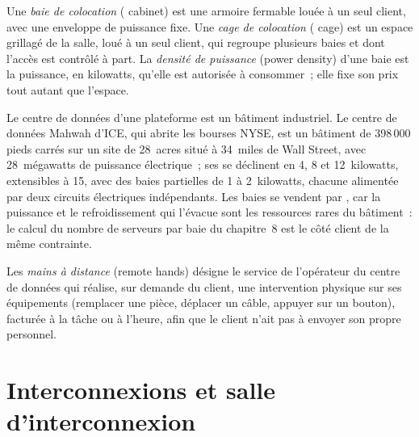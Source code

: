 \begin{definition}\label{def:nw:colocation-products-and-how-they-are-sold:cabinet}
Une \emph{baie de colocation} ( cabinet) est une armoire fermable louée à un seul client, avec une enveloppe de puissance fixe. Une
\emph{cage de colocation} ( cage) est un espace grillagé de la salle, loué à un seul client, qui regroupe plusieurs baies et dont l'accès
est contrôlé à part. La \emph{densité de puissance} (power density) d'une baie est la puissance, en kilowatts, qu'elle est autorisée à consommer~; elle
fixe son prix tout autant que l'espace.
\end{definition}

Le centre de données d'une plateforme est un bâtiment industriel. Le centre de données Mahwah d'ICE, qui abrite les bourses NYSE, est un bâtiment de 398\,000
pieds carrés sur un site de 28~acres situé à 34~miles de Wall Street, avec 28~mégawatts de puissance électrique~; ses  se déclinent en 4, 8 et
12~kilowatts, extensibles à 15, avec des baies partielles de 1 à 2~kilowatts, chacune alimentée par deux circuits électriques indépendants. Les baies se vendent par
, car la puissance et le refroidissement qui l'évacue sont les ressources rares du bâtiment~: le calcul du nombre de serveurs par baie du chapitre~8
est le côté client de la même contrainte.

\begin{definition}\label{def:nw:colocation-products-and-how-they-are-sold:hands}
Les \emph{mains à distance} (remote hands) désigne le service de l'opérateur du centre de données qui réalise, sur demande du client, une intervention physique sur ses équipements
(remplacer une pièce, déplacer un câble, appuyer sur un bouton), facturée à la tâche ou à l'heure, afin que le client n'ait pas à envoyer
son propre personnel.
\end{definition}

\section{Interconnexions et salle d'interconnexion}

